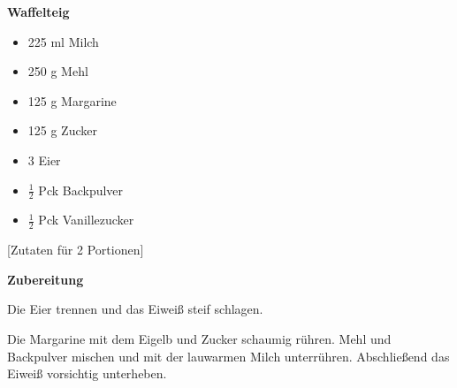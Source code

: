 

\parindent0pt	

\pagestyle{empty}


\textbf{\LARGE{Waffelteig}}%

\hrulefill
\vspace*{\fill}
\begin{multicols}{2}	


\begin{itemize}
\item 225 ml Milch
\item 250 g Mehl
\item 125 g Margarine
\item 125 g Zucker
\item 3 Eier
\item $\frac{1}{2}$ Pck Backpulver
\item $\frac{1}{2}$ Pck Vanillezucker
\end{itemize}
\end{multicols}
\vfill									%

\vspace{2cm}
%
\begin{center}
%
[Zutaten für 2 Portionen]%
\end{center}



\vfill
\newpage
\textbf{{\LARGE Zubereitung}}%

\hrulefill

\vspace*{\fill}
\begin{multicols}{2}

Die Eier trennen und das Eiweiß steif schlagen.\newline

Die Margarine mit dem Eigelb und Zucker schaumig rühren.
Mehl und Backpulver mischen und mit der lauwarmen Milch unterrühren.\newline
Abschließend das Eiweiß vorsichtig unterheben.





\end{multicols}
\vfill
